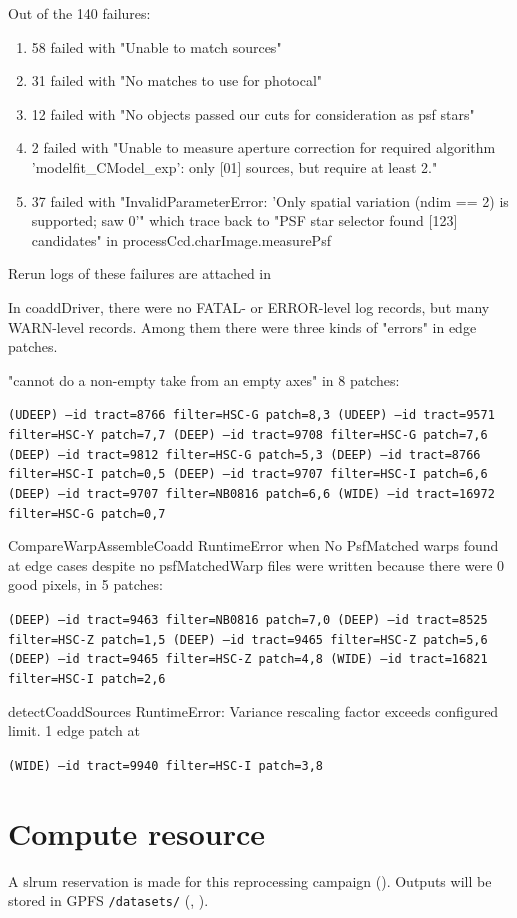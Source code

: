 Out of the 140 failures:

\begin{enumerate}
\item
58 failed with "Unable to match sources"
\item
31 failed with "No matches to use for photocal"
\item
12 failed with "No objects passed our cuts for consideration as psf stars"
\item
2 failed with "Unable to measure aperture correction for required algorithm 'modelfit\_CModel\_exp': only [01] sources, but require at least 2."
\item
37 failed with "InvalidParameterError: 'Only spatial variation (ndim == 2) is supported; saw 0'" which trace back to "PSF star selector found [123] candidates" in processCcd.charImage.measurePsf
\end{enumerate}

Rerun logs of these failures are attached in 


In coaddDriver, there were no FATAL- or ERROR-level log records, but many WARN-level records.  Among them there were three kinds of "errors" in edge patches.

 "cannot do a non-empty take from an empty axes" in 8 patches:

\texttt{(UDEEP) --id tract=8766 filter=HSC-G patch=8,3
(UDEEP) --id tract=9571 filter=HSC-Y patch=7,7
(DEEP) --id tract=9708 filter=HSC-G patch=7,6
(DEEP) --id tract=9812 filter=HSC-G patch=5,3
(DEEP) --id tract=8766 filter=HSC-I patch=0,5
(DEEP) --id tract=9707 filter=HSC-I patch=6,6
(DEEP) --id tract=9707 filter=NB0816 patch=6,6
(WIDE) --id tract=16972 filter=HSC-G patch=0,7
}

 CompareWarpAssembleCoadd RuntimeError when No PsfMatched warps found at edge cases despite no psfMatchedWarp files were written because there were 0 good pixels, in 5 patches:

\texttt{(DEEP) --id tract=9463 filter=NB0816 patch=7,0
(DEEP) --id tract=8525 filter=HSC-Z patch=1,5
(DEEP) --id tract=9465 filter=HSC-Z patch=5,6
(DEEP) --id tract=9465 filter=HSC-Z patch=4,8
(WIDE) --id tract=16821 filter=HSC-I patch=2,6
}

 detectCoaddSources RuntimeError: Variance rescaling factor exceeds configured limit.  1 edge patch at

\texttt{(WIDE) --id tract=9940 filter=HSC-I patch=3,8 }


\section{Compute resource}
A slrum reservation is made for this reprocessing campaign ().
Outputs will be stored in GPFS \texttt{/datasets/}   (, ).

